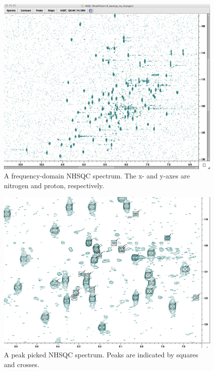 \begin{figure}
  \includegraphics[scale=0.35]{figures/nhsqc}
  \caption[A frequency-domain NHSQC spectrum.]
          {A frequency-domain NHSQC spectrum. 
           The x- and y-axes are nitrogen and proton, respectively.}
  \label{nhsqc}
\end{figure}

\begin{figure}
  \includegraphics[scale=0.30]{figures/nhsqc_peaks}
  \caption[A peak picked NHSQC spectrum.]
          {A peak picked NHSQC spectrum. 
           Peaks are indicated by squares and crosses.}
  \label{nhsqc_peaks}
\end{figure}

